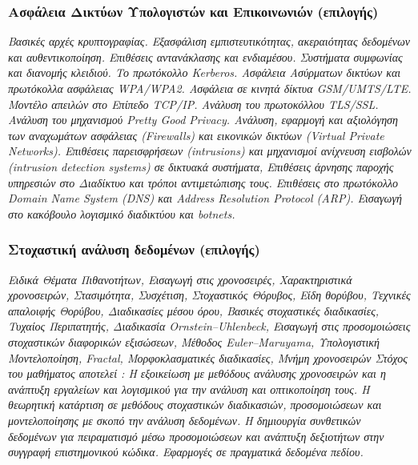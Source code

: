 \hypertarget{ux3b1ux3c3ux3c6ux3acux3bbux3b5ux3b9ux3b1-ux3b4ux3b9ux3baux3c4ux3cdux3c9ux3bd-ux3c5ux3c0ux3bfux3bbux3bfux3b3ux3b9ux3c3ux3c4ux3ceux3bd-ux3baux3b1ux3b9-ux3b5ux3c0ux3b9ux3baux3bfux3b9ux3bdux3c9ux3bdux3b9ux3ceux3bd-ux3b5ux3c0ux3b9ux3bbux3bfux3b3ux3aeux3c2}{%
\subsubsection{Ασφάλεια Δικτύων Υπολογιστών και Επικοινωνιών
(επιλογής)}\label{ux3b1ux3c3ux3c6ux3acux3bbux3b5ux3b9ux3b1-ux3b4ux3b9ux3baux3c4ux3cdux3c9ux3bd-ux3c5ux3c0ux3bfux3bbux3bfux3b3ux3b9ux3c3ux3c4ux3ceux3bd-ux3baux3b1ux3b9-ux3b5ux3c0ux3b9ux3baux3bfux3b9ux3bdux3c9ux3bdux3b9ux3ceux3bd-ux3b5ux3c0ux3b9ux3bbux3bfux3b3ux3aeux3c2}}

\emph{Βασικές αρχές κρυπτογραφίας. Εξασφάλιση εμπιστευτικότητας,
ακεραιότητας δεδομένων και αυθεντικοποίηση. Επιθέσεις αντανάκλασης και
ενδιαμέσου. Συστήματα συμφωνίας και διανομής κλειδιού. Tο πρωτόκολλο
Kerberos. Ασφάλεια Ασύρματων δικτύων και πρωτόκολλα ασφάλειας WPA/WPA2.
Ασφάλεια σε κινητά δίκτυα GSM/UMTS/LTE. Μοντέλο απειλών στο Επίπεδο
TCP/IP. Ανάλυση του πρωτοκόλλου TLS/SSL. Ανάλυση του μηχανισμού Pretty
Good Privacy. Ανάλυση, εφαρμογή και αξιολόγηση των αναχωμάτων ασφάλειας
(Firewalls) και εικονικών δικτύων (Virtual Private Networks). Επιθέσεις
παρεισφρήσεων (intrusions) και μηχανισμοί ανίχνευση εισβολών (intrusion
detection systems) σε δικτυακά συστήματα, Επιθέσεις άρνησης παροχής
υπηρεσιών στο Διαδίκτυο και τρόποι αντιμετώπισης τους. Επιθέσεις στο
πρωτόκολλο Domain Name System (DNS) και Address Resolution Protocol
(ARP). Εισαγωγή στο κακόβουλο λογισμικό διαδικτύου και botnets.}

\hypertarget{ux3c3ux3c4ux3bfux3c7ux3b1ux3c3ux3c4ux3b9ux3baux3ae-ux3b1ux3bdux3acux3bbux3c5ux3c3ux3b7-ux3b4ux3b5ux3b4ux3bfux3bcux3adux3bdux3c9ux3bd-ux3b5ux3c0ux3b9ux3bbux3bfux3b3ux3aeux3c2}{%
\subsubsection{Στοχαστική ανάλυση δεδομένων
(επιλογής)}\label{ux3c3ux3c4ux3bfux3c7ux3b1ux3c3ux3c4ux3b9ux3baux3ae-ux3b1ux3bdux3acux3bbux3c5ux3c3ux3b7-ux3b4ux3b5ux3b4ux3bfux3bcux3adux3bdux3c9ux3bd-ux3b5ux3c0ux3b9ux3bbux3bfux3b3ux3aeux3c2}}

\emph{Ειδικά Θέματα Πιθανοτήτων, Εισαγωγή στις χρονοσειρές,
Χαρακτηριστικά χρονοσειρών, Στασιμότητα, Συσχέτιση, Στοχαστικός Θόρυβος,
Είδη θορύβου, Τεχνικές απαλοιφής Θορύβου, Διαδικασίες μέσου όρου,
Βασικές στοχαστικές διαδικασίες, Τυχαίος Περιπατητής, Διαδικασία
Ornstein--Uhlenbeck, Εισαγωγή στις προσομοιώσεις στοχαστικών διαφορικών
εξισώσεων, Μέθοδος Euler--Maruyama, Υπολογιστική Μοντελοποίηση, Fractal,
Μορφοκλασματικές διαδικασίες, Μνήμη χρονοσειρών Στόχος του μαθήματος
αποτελεί : Η εξοικείωση με μεθόδους ανάλυσης χρονοσειρών και η ανάπτυξη
εργαλείων και λογισμικού για την ανάλυση και οπτικοποίηση τους. Η
θεωρητική κατάρτιση σε μεθόδους στοχαστικών διαδικασιών, προσομοιώσεων
και μοντελοποίησης με σκοπό την ανάλυση δεδομένων. Η δημιουργία
συνθετικών δεδομένων για πειραματισμό μέσω προσομοιώσεων και ανάπτυξη
δεξιοτήτων στην συγγραφή επιστημονικού κώδικα. Εφαρμογές σε πραγματικά
δεδομένα πεδίου.}

